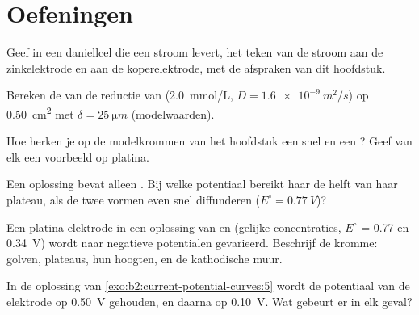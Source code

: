\section{Oefeningen}

\begin{exercise}[$\star$]\label{exo:b2:current-potential-curves:1}
Geef in een daniellcel die een stroom levert, het teken van de stroom aan de
zinkelektrode en aan de koperelektrode, met de afspraken van dit
hoofdstuk.
\end{exercise}

\begin{exercise}[$\star$]\label{exo:b2:current-potential-curves:2}
Bereken de  van de reductie van  (\qty{2.0}{mmol/L}, $D =
\qty{1.6e-9}{m^2/s}$) op \qty{0.50}{cm^2} met $\delta = \qty{25}{\micro m}$
(modelwaarden).
\end{exercise}

\begin{exercise}[$\star$]\label{exo:b2:current-potential-curves:3}
Hoe herken je op de modelkrommen van het hoofdstuk een snel en een ? Geef van elk een voorbeeld op platina.
\end{exercise}

\begin{exercise}[$\star$]\label{exo:b2:current-potential-curves:4}
Een oplossing bevat alleen . Bij welke potentiaal bereikt haar 
de helft van haar plateau, als de twee vormen even snel diffunderen ($E^\circ = \qty{0.77}{V}$)?
\end{exercise}

\begin{exercise}[$\star\star$]\label{exo:b2:current-potential-curves:5}
Een platina-elektrode in een oplossing van  en  (gelijke
concentraties, $E^\circ$ = 0.77 en \qty{0.34}{V}) wordt naar negatieve
potentialen gevarieerd. Beschrijf de kromme: golven, plateaus, hun hoogten, en de
kathodische muur.
\end{exercise}

\begin{exercise}[$\star\star$]\label{exo:b2:current-potential-curves:6}
In de oplossing van \cref{exo:b2:current-potential-curves:5} wordt de potentiaal van
de elektrode op \qty{0.50}{V} gehouden, en daarna op \qty{0.10}{V}. Wat gebeurt er in
elk geval?
\end{exercise}


